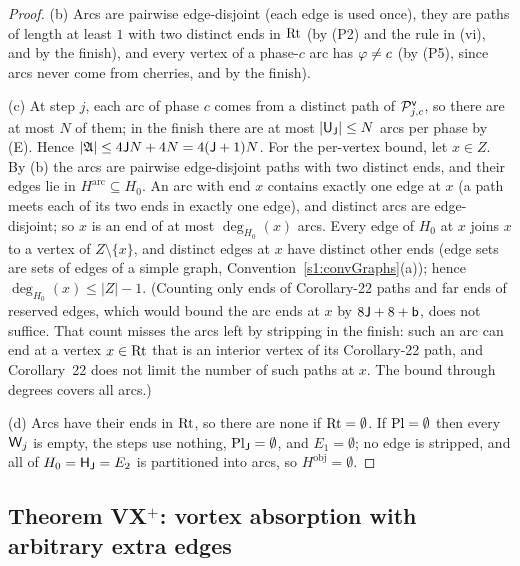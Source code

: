 \begin{proof}
(b) Arcs are pairwise edge-disjoint (each edge is used once), they are paths of length at least $1$ with two
distinct ends in $\mathrm{Rt}$ (by (P2) and the rule in (vi), and by the finish), and every vertex of a phase-$c$ arc has
$\varphi\ne c$ (by (P5), since arcs never come from cherries, and by the finish).

(c) At step $j$, each arc of phase $c$ comes from a distinct path of $\mathcal{P}^{\mathsf{v}}_{j,c}$, so there are at most $N$ of
them; in the finish there are at most $|\mathsf{U}_{\mathsf{J}}|\le N$ arcs per phase by \textup{(E)}. Hence
$|\mathfrak A|\le4\mathsf{J} N+4N=4(\mathsf{J}+1)N$. For the per-vertex bound, let $x\in Z$. By (b) the arcs are pairwise
edge-disjoint paths with two distinct ends, and their edges lie in $H^{\mathrm{arc}}\subseteq H_0$. An arc with end
$x$ contains exactly one edge at $x$ (a path meets each of its two ends in exactly one edge), and distinct arcs are
edge-disjoint; so $x$ is an end of at most $\deg_{H_0}(x)$ arcs. Every edge of $H_0$ at $x$ joins $x$ to a vertex of
$Z\setminus\{x\}$, and distinct edges at $x$ have distinct other ends (edge sets are sets of edges of a simple graph,
Convention~\ref{s1:convGraphs}(a)); hence $\deg_{H_0}(x)\le|Z|-1$. (Counting only ends of Corollary-22 paths and
far ends of reserved edges, which would bound the arc ends at $x$ by $8\mathsf{J}+8+\mathsf{b}$, does not suffice. That count
misses the arcs left by stripping in the finish: such an arc can end at a vertex $x\in\mathrm{Rt}$ that is an interior vertex of its
Corollary-22 path, and Corollary~22 does not limit the number of such paths at $x$. The bound through degrees covers
all arcs.)

(d) Arcs have their ends in $\mathrm{Rt}$, so there are none if $\mathrm{Rt}=\emptyset$. If $\mathrm{Pl}=\emptyset$ then every $\mathsf{W}_j$ is
empty, the steps use nothing, $\mathrm{Pl}_{\mathsf{J}}=\emptyset$, and $E_1=\emptyset$; no edge is stripped, and all of
$H_0=\mathsf{H}_{\mathsf{J}}=E_2$ is partitioned into arcs, so $H^{\mathrm{obj}}=\emptyset$.
\end{proof}

\subsection{Theorem \texorpdfstring{VX$^+$}{VX+}: vortex absorption with arbitrary extra edges}\label{s4:ssecVX}


